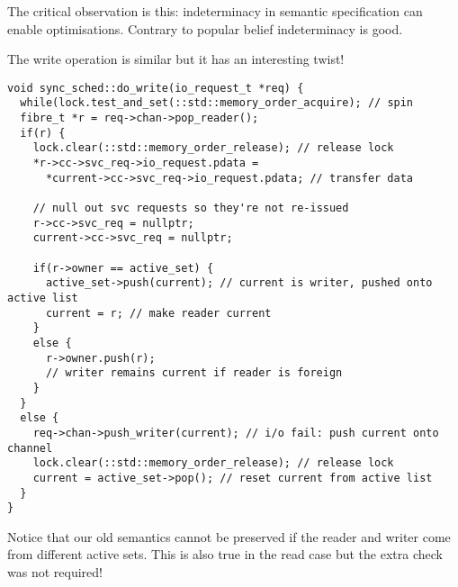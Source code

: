 \documentclass[oneside]{book}
\begin{document}
The critical observation is this: indeterminacy in semantic
specification can enable optimisations. Contrary to popular
belief indeterminacy is good.

The write operation is similar but it has an interesting twist!

\begin{verbatim}
void sync_sched::do_write(io_request_t *req) {
  while(lock.test_and_set(::std::memory_order_acquire); // spin
  fibre_t *r = req->chan->pop_reader();
  if(r) {
    lock.clear(::std::memory_order_release); // release lock
    *r->cc->svc_req->io_request.pdata = 
      *current->cc->svc_req->io_request.pdata; // transfer data

    // null out svc requests so they're not re-issued
    r->cc->svc_req = nullptr;
    current->cc->svc_req = nullptr;

    if(r->owner == active_set) {
      active_set->push(current); // current is writer, pushed onto active list
      current = r; // make reader current
    }
    else {
      r->owner.push(r);
      // writer remains current if reader is foreign
    }
  }
  else {
    req->chan->push_writer(current); // i/o fail: push current onto channel
    lock.clear(::std::memory_order_release); // release lock
    current = active_set->pop(); // reset current from active list
  }
}

\end{verbatim}

Notice that our old semantics cannot be preserved if the reader and
writer come from different active sets. This is also true in the read
case but the extra check was not required!
\end{document}
